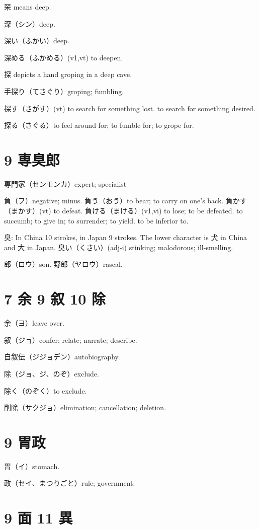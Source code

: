 罙 means deep.

深（シン）deep.

深い（ふかい）deep.

深める（ふかめる）(v1,vt) to deepen.

探 depicts a hand groping in a deep cave.

手探り（てさぐり）groping; fumbling.

探す（さがす）(vt)
to search for something lost.
to search for something desired.

探る（さぐる）to feel around for; to fumble for; to grope for.

\section{9 専臭郎}

専門家（センモンカ）expert; specialist

負（フ）negative; minus.
負う（おう）to bear; to carry on one's back.
負かす（まかす）(vt) to defeat.
負ける（まける）(v1,vi)
to lose; to be defeated.
to succumb; to give in; to surrender; to yield.
to be inferior to.

臭: In China 10 strokes, in Japan 9 strokes.
The lower character is 犬 in China and 大 in Japan.
臭い（くさい）(adj-i) stinking; malodorous; ill-smelling.

郎（ロウ）son.
野郎（ヤロウ）rascal.

\section{7 余 9 叙 10 除}

余（ヨ）leave over.

叙（ジョ）confer; relate; narrate; describe.

自叙伝（ジジョデン）autobiography.

除（ジョ、ジ、のぞ）exclude.

除く（のぞく）to exclude.

削除（サクジョ）elimination; cancellation; deletion.

\section{9 胃政}

胃（イ）stomach.

政（セイ、まつりごと）rule; government.

\section{9 面 11 異}

